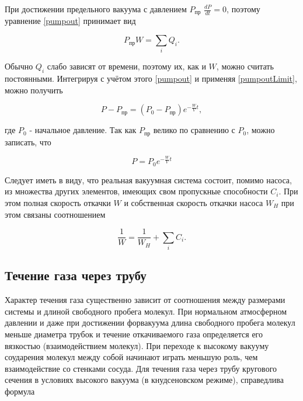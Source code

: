 \documentclass[a4paper,12pt]{article} %
\begin{document}
При достижении предельного вакуума с давлением $P_\text{пр}$ $\frac{dP}{dt} = 0$, поэтому уравнение \eqref{pumpout} принимает вид

\begin{equation}
    P_\text{пр}W = \sum\limits_i Q_i.
    \label{pumpoutLimit}
\end{equation}

Обычно $Q_i$ слабо зависят от времени, поэтому их, как и $W$, можно считать постоянными. Интегрируя с учётом этого \eqref{pumpout} и применяя \eqref{pumpoutLimit}, можно получить

\begin{equation}
    P - P_\text{пр} = (P_0 - P_\text{пр})e^{-\frac{W}{V}t},
    \label{pressure1}
\end{equation}

где $P_0$ - начальное давление. Так как $P_\text{пр}$ велико по сравнению с $P_0$, можно записать, что

\begin{equation}
    P = P_0e^{-\frac{W}{V}t}
\end{equation}

Следует иметь в виду, что реальная вакуумная система состоит, помимо насоса, из множества других элементов, имеющих свом пропускные способности $C_i$. При этом полная скорость откачки $W$ и собственная скорость откачки насоса $W_H$ при этом связаны соотношением 

\begin{equation}
    \frac{1}{W} = \frac{1}{W_H} + \sum\limits_i C_i.
\end{equation}

\subsection{Течение газа через трубу}

Характер течения газа существенно зависит от соотношения между размерами системы и длиной свободного пробега молекул. При нормальном атмосферном давлении и даже при достижении форвакуума длина свободного пробега молекул меньше диаметра трубок и течение откачиваемого газа определяется его вязкостью (взаимодействием молекул). При переходе к высокому вакууму соударения молекул между собой начинают играть меньшую роль, чем взаимодействие со стенками сосуда. Для течения газа через трубу кругового сечения в условиях высокого вакуума (в кнудсеновском режиме), справедлива формула
\end{document}
